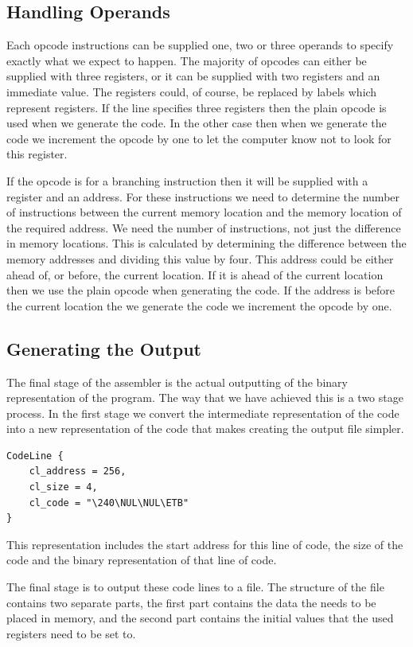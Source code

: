 \documentclass[a4paper,11pt]{report}
\begin{document}
\subsection{Handling Operands}
Each opcode instructions can be supplied one, two or three operands to specify exactly what we expect to happen. The majority of opcodes can either be supplied with three registers, or it can be supplied with two registers and an immediate value. The registers could, of course, be replaced by labels which represent registers. If the line specifies three registers then the plain opcode is used when we generate the code. In the other case then when we generate the code we increment the opcode by one to let the computer know not to look for this register.

If the opcode is for a branching instruction then it will be supplied with a register and an address. For these instructions we need to determine the number of instructions between the current memory location and the memory location of the required address. We need the number of instructions, not just the difference in memory locations. This is calculated by determining the difference between the memory addresses and dividing this value by four. This address could be either ahead of, or before, the current location. If it is ahead of the current location then we use the plain opcode when generating the code. If the address is before the current location the we generate the code we increment the opcode by one.
\subsection{Generating the Output}
The final stage of the assembler is the actual outputting of the binary representation of the program. The way that we have achieved this is a two stage process. In the first stage we convert the intermediate representation of the code into a new representation of the code that makes creating the output file simpler.

\begin{lstlisting}[basicstyle=\ttfamily\small]
CodeLine {
	cl_address = 256, 
	cl_size = 4, 
	cl_code = "\240\NUL\NUL\ETB"
}
\end{lstlisting}

This representation includes the start address for this line of code, the size of the code and the binary representation of that line of code.

The final stage is to output these code lines to a file. The structure of the file contains two separate parts, the first part contains the data the needs to be placed in memory, and the second part contains the initial values that the used registers need to be set to.
\end{document}
